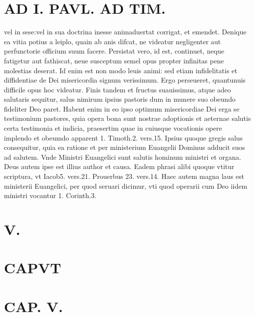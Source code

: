 \documentclass{article}
\begin{document}
\begin{pages}
\section*{AD I. PAVL. AD TIM. }
\marginpar{[ p.230 ]}\pstart vel in sese:vel in sua doctrina inesse animaduertat corrigat, et emendet. Denique ea vitia potius a leiplo, quain ab anis difcat, ne videatur negligenter aut perfunctorie officium suum facere.  \pend\pstart Persistat vero, id est, continuet, neque fatigetur aut fathiscat, neue susceptum semel opus propter infinitas pene molestias deserat. Id enim est non modo leuis animi: sed etiam infidelitatis et diffidentiae de Dei misericordia signum verissimum. Ergo perseueret, quantunuis difficile opus hoc videatur.  \pend\pstart Finis tandem et fructus suauissimus, atque adeo salutaris sequitur, salus nimirum ipsius pastoris dum in munere suo obeundo fideliter Deo paret. Habent enim in eo ipso optimum misericordiae Dei erga se testimonium pastores, quia opera bona sunt nostrae adoptionis et aeternae salutis certa testimonia et indicia, praesertim quae in cuiusque vocationis opere implendo et obeumdo apparent 1. Timoth.2. vers.15.  \pend\pstart Ipsius quoque gregis salus consequitur, quia ea ratione et per ministerium Euangelii Dominus adducit suos ad salutem. Vnde Ministri Euangelici sunt salutis hominum ministri et organa. Deus autem ipse est illius author et causa. Eadem phrasi alibi quoque vtitur scriptura, vt Iacob5. vers.21. Prouerbus  23. vers.14. Haec autem magna laus est ministerii Euangelici, per quod seruari dicimur, vti quod operarii cum Deo iidem ministri vocantur 1. Corinth.3.  \pend
\section*{V. }
\section*{CAPVT  }
\marginpar{[ p.239 ]}
\endnumbering\beginnumbering\section{CAP. V.}
{}

\end{pages}
\end{document}
